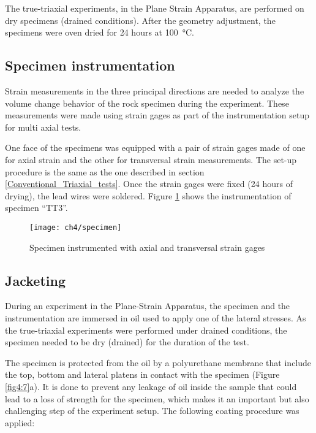 The true-triaxial experiments, in the Plane Strain Apparatus, are performed on dry specimens (drained conditions). After the geometry adjustment, the specimens were oven dried for 24 hours at \SI{100}{\celsius}.

\subsection{Specimen instrumentation}

Strain measurements in the three principal directions are needed to analyze the volume change behavior of the rock specimen during the experiment. These measurements were made using strain gages as part of the instrumentation setup for multi axial tests. 

One face of the specimens was equipped with a pair of strain gages made of one for axial strain and the other for transversal strain measurements. The set-up procedure is the same as the one described in section \ref{Conventional_Triaxial_tests}. Once the strain gages were fixed (24 hours of drying), the lead wires were soldered. Figure \ref{fig4:6} shows the instrumentation of specimen “TT3”.  

\begin{figure}[tb]
    \centering
    \texttt{[image: ch4/specimen]}
    \captionsetup{justification=centering}
    \caption{Specimen instrumented with axial and transversal strain gages}
    \label{fig4:6}
\end{figure} 

\subsection{Jacketing}

During an experiment in the Plane-Strain Apparatus, the specimen and the instrumentation are immersed in oil used to apply one of the lateral stresses. As the true-triaxial experiments were performed under drained conditions, the specimen needed to be dry (drained) for the duration of the test. 

The specimen is protected from the oil by a polyurethane membrane that include the top, bottom and lateral platens in contact with the specimen (Figure \ref{fig4:7}a). It is done to prevent any leakage of oil inside the sample that could lead to a loss of strength for the specimen, which makes it an important but also challenging step of the experiment setup. The following coating procedure was applied: 

